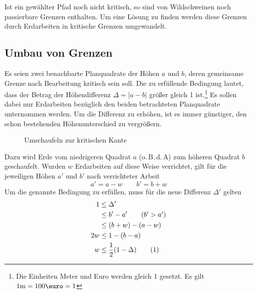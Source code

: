 \documentclass[a4paper, 12pt]{scrartcl}
\newcommand{\tagyoureit}{\addtocounter{equation}{1}\tag{\theequation}}
\begin{document}
Ist ein gewählter Pfad noch nicht kritisch, so sind von Wildschweinen noch passierbare Grenzen enthalten. Um eine Lösung zu finden werden diese Grenzen durch Erdarbeiten in kritische Grenzen umgewandelt.
\subsection{Umbau von Grenzen}
Es seien zwei benachbarte Planquadrate der Höhen $a$ und $b$, deren gemeinsame Grenze nach Bearbeitung kritisch sein soll. Die zu erfüllende Bedingung lautet, dass der Betrag der Höhendifferenz $\Delta = |a-b|$ größer gleich 1 ist.\footnote{Die Einheiten Meter und Euro werden gleich 1 gesetzt. Es gilt $1 \mathrm{m} = 100\text{\euro} = 1$} Es sollen dabei nur Erdarbeiten bezüglich den beiden betrachteten Planquadrate unternommen werden. Um die Differenz zu erhöhen, ist es immer günstiger, den schon bestehenden Höhenunterschied zu vergrößern.
\begin{figure}[H]
	\centering
	\caption{Umschaufeln zur kritischen Kante}
\end{figure}
Dazu wird Erde vom niedrigeren Quadrat $a$ (o.\,B.\,d.\,A) zum höheren Quadrat $b$ geschaufelt. Wurden $w$ Erdarbeiten auf diese Weise verrichtet, gilt für die jeweiligen Höhen $a'$ und $b'$ nach verrichteter Arbeit
\begin{equation*}
	a' = a - w \qquad b' = b + w
\end{equation*}
Um die genannte Bedingung zu erfüllen, muss für die neue Differenz $\Delta'$ gelten
\begin{align*}
	 1&\le \Delta'  \\
	 &\le b' - a' \tag{$b' > a'$}\\
	 &\le (b+w) - (a - w)\\
	 2w &\le 1 - (b-a)\\
	 w &\le \frac{1}{2}(1 - \Delta) \tagyoureit\label{eq:arbeit}
\end{align*}
\end{document}
